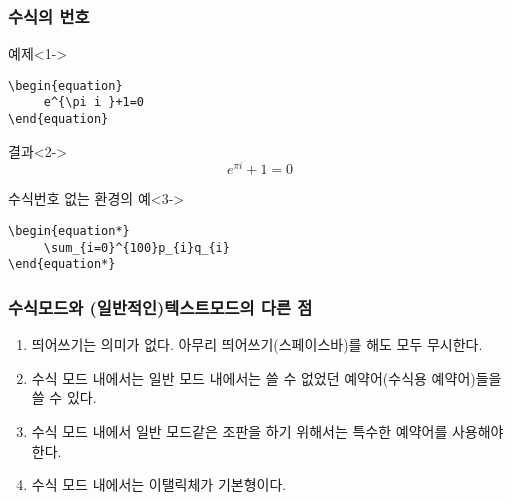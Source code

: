 \documentclass{beamer}
\begin{document}
\begin{frame}[fragile]
\frametitle{수식의 번호}
\begin{block}{예제}<1->
\begin{verbatim}
\begin{equation}
     e^{\pi i }+1=0
\end{equation}
\end{verbatim}
\end{block}

\begin{block}{결과}<2->
\begin{equation}
e^{\pi i }+1=0
\end{equation}
\end{block}



\begin{block}{수식번호 없는 환경의 예}<3->
\begin{center}
\begin{verbatim}
\begin{equation*}
     \sum_{i=0}^{100}p_{i}q_{i}
\end{equation*}
\end{verbatim}
\end{center}
\end{block}

\end{frame}


\begin{frame}
\frametitle{수식모드와 (일반적인)텍스트모드의 다른 점}

\begin{block}{}
\begin{enumerate}[차이점1.]
\item <1->띄어쓰기는 의미가 없다. 아무리 띄어쓰기(스페이스바)를 해도  모두 무시한다. 
\item <2->수식 모드 내에서는 일반 모드 내에서는 쓸 수 없었던 예약어(수식용 예약어)들을 쓸 수 있다.
\item <3->수식 모드 내에서 일반 모드같은 조판을 하기 위해서는 특수한 예약어를 사용해야 한다. 
\item <4->수식 모드 내에서는 이탤릭체가 기본형이다.
\end{enumerate}


\end{block}
\end{frame}
\end{document}
